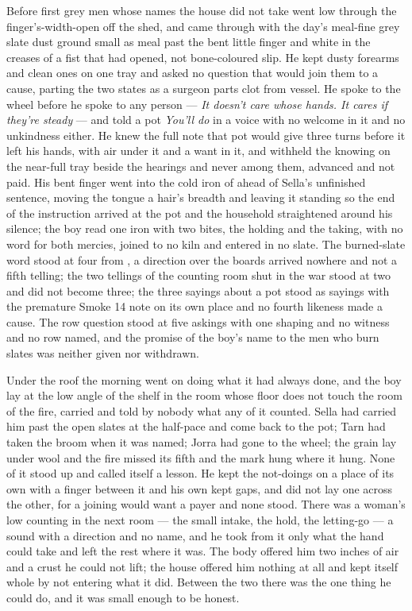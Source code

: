 Before first grey men whose names the house did not take went low through the finger's-width-open  off the shed, and  came through with the day's meal-fine grey slate dust ground small as meal past the bent little finger and white in the creases of a fist that had opened, not bone-coloured slip. He kept dusty forearms and clean ones on one tray and asked no question that would join them to a cause, parting the two states as a surgeon parts clot from vessel. He spoke to the wheel before he spoke to any person --- \emph{It doesn't care whose hands. It cares if they're steady} --- and told a pot \emph{You'll do} in a voice with no welcome in it and no unkindness either. He knew the full note that pot would give three turns before it left his hands, with air under it and a want in it, and withheld the knowing on the near-full tray beside the hearings and never among them, advanced and not paid. His bent finger went into the cold iron of  ahead of Sella's unfinished sentence, moving the tongue a hair's breadth and leaving it standing so the end of the instruction arrived at the pot and the household straightened around his silence; the boy read one iron with two bites, the holding and the taking, with no  word for both mercies, joined to no kiln and entered in no slate. The burned-slate word stood at four from , a direction over the boards arrived nowhere and not a fifth telling; the two tellings of the counting room shut in the war stood at two and did not become three; the three sayings about a pot stood as sayings with the premature Smoke 14 note on its own place and no fourth likeness made a cause. The row question stood at five askings with one shaping and no witness and no row named, and the promise of the boy's name to the men who burn slates was neither given nor withdrawn.

\scenebreak

Under the roof the morning went on doing what it had always done, and the boy lay at the low angle of the shelf in the room whose floor does not touch the room of the fire, carried and told by nobody what any of it counted. Sella had carried him past the open slates at the half-pace and come back to the pot; Tarn had taken the broom when it was named; Jorra had gone to the wheel; the grain lay under wool and the fire missed its fifth and the mark hung where it hung. None of it stood up and called itself a lesson. He kept the not-doings on a place of its own with a finger between it and his own kept gaps, and did not lay one across the other, for a joining would want a payer and none stood. There was a woman's low counting in the next room --- the small intake, the hold, the letting-go --- a sound with a direction and no name, and he took from it only what the hand could take and left the rest where it was. The body offered him two inches of air and a crust he could not lift; the house offered him nothing at all and kept itself whole by not entering what it did. Between the two there was the one thing he could do, and it was small enough to be honest.

